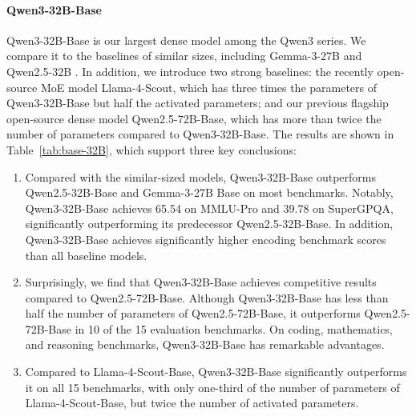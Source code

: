 \documentclass[dvipsnames]{article}
\begin{document}
\paragraph{Qwen3-32B-Base}
Qwen3-32B-Base is our largest dense model among the Qwen3 series. We compare it to the baselines of similar sizes, including Gemma-3-27B \citep{gemma3} and Qwen2.5-32B \citep{qwen2.5}. In addition, we introduce two strong baselines: the recently open-source MoE model Llama-4-Scout, which has three times the parameters of Qwen3-32B-Base but half the activated parameters; and our previous flagship open-source dense model Qwen2.5-72B-Base, which has more than twice the number of parameters compared to Qwen3-32B-Base.
The results are shown in Table~\ref{tab:base-32B}, which support three key conclusions:
\begin{enumerate}[label=(\arabic*)]
\item Compared with the similar-sized models, Qwen3-32B-Base outperforms Qwen2.5-32B-Base and Gemma-3-27B Base on most benchmarks. Notably, Qwen3-32B-Base achieves 65.54 on MMLU-Pro and 39.78 on SuperGPQA, significantly outperforming its predecessor Qwen2.5-32B-Base. In addition, Qwen3-32B-Base achieves significantly higher encoding benchmark scores than all baseline models.
\item Surprisingly, we find that Qwen3-32B-Base achieves competitive results compared to Qwen2.5-72B-Base. Although Qwen3-32B-Base has less than half the number of parameters of Qwen2.5-72B-Base, it outperforms Qwen2.5-72B-Base in 10 of the 15 evaluation benchmarks. On coding, mathematics, and reasoning benchmarks, Qwen3-32B-Base has remarkable advantages.
\item Compared to Llama-4-Scout-Base, Qwen3-32B-Base significantly outperforms it on all 15 benchmarks, with only one-third of the number of parameters of Llama-4-Scout-Base, but twice the number of activated parameters.
\end{enumerate}
\end{document}
